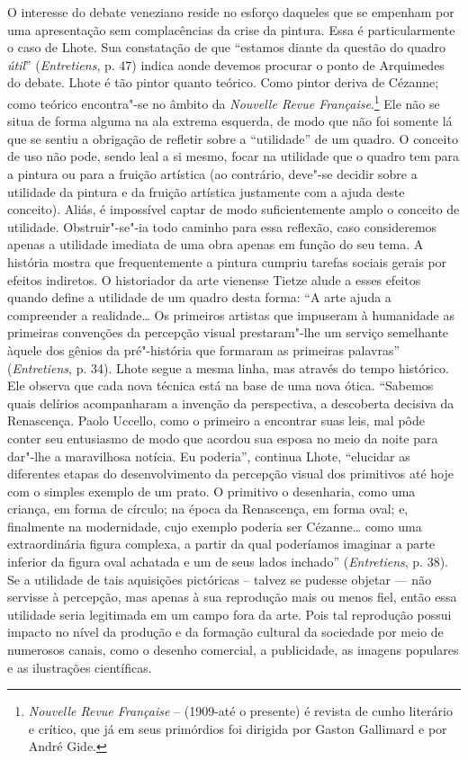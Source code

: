 O interesse do debate veneziano reside no esforço daqueles que se empenham por
uma apresentação sem complacências da crise da pintura. Essa é particularmente o caso
de Lhote. Sua constatação de que ``estamos diante da questão do quadro
\emph{útil}'' (\emph{Entretiens}, p. 47) indica aonde devemos
procurar o ponto de Arquimedes do debate. Lhote é tão pintor quanto
teórico. Como pintor deriva de Cézanne; como teórico encontra"-se no âmbito
da \emph{Nouvelle Revue Française}.\footnote{\emph{Nouvelle Revue
  Française} --  (1909-até o presente) é revista de cunho literário e
  crítico, que já em seus primórdios foi dirigida por Gaston Gallimard e
  por André Gide. \versal{[N. E.]}} Ele não se situa de forma alguma na ala extrema
esquerda, de modo que não foi somente lá que se sentiu a obrigação de refletir sobre
a ``utilidade'' de um quadro. O conceito de uso não pode, sendo leal a si
mesmo, focar na utilidade que o quadro tem para a pintura ou para a
fruição artística (ao contrário, deve"-se decidir sobre a utilidade da pintura e da fruição artística justamente com a ajuda deste conceito). Aliás, é impossível captar de modo
suficientemente amplo o conceito de utilidade. Obstruir"-se"-ia todo
caminho para essa reflexão, caso consideremos apenas a utilidade imediata de uma
obra apenas em função do seu tema. A história mostra que frequentemente a pintura
cumpriu tarefas sociais gerais por efeitos indiretos.
O historiador da arte vienense Tietze alude a esses efeitos quando define
a utilidade de um quadro desta forma: ``A arte ajuda a compreender a realidade\ldots{}
Os primeiros artistas que impuseram à humanidade as primeiras convenções
da percepção visual prestaram"-lhe um serviço semelhante àquele dos
gênios da pré"-história que formaram as primeiras palavras''
(\emph{Entretiens}, p. 34). Lhote segue a mesma linha, mas através do tempo
histórico. Ele observa que cada nova técnica está na base de uma nova
ótica. ``Sabemos quais delírios acompanharam a invenção da perspectiva,
a descoberta decisiva da Renascença. Paolo Uccello, como o primeiro a
encontrar suas leis, mal pôde conter seu entusiasmo de modo que acordou
sua esposa no meio da noite para dar"-lhe a maravilhosa notícia. Eu
poderia'', continua Lhote, ``elucidar as diferentes etapas do
desenvolvimento da percepção visual dos primitivos até hoje com o
simples exemplo de um prato. O primitivo o desenharia, como uma
criança, em forma de círculo; na época da Renascença, em forma oval; e,
finalmente na modernidade, cujo exemplo poderia ser Cézanne\ldots{} como
uma extraordinária figura complexa, a partir da qual poderíamos
imaginar a parte inferior da figura oval achatada e um de seus lados
inchado'' (\emph{Entretiens}, p. 38). Se a utilidade de tais aquisições
pictóricas -- talvez se pudesse objetar --- não servisse à percepção, mas
apenas à sua reprodução mais ou menos fiel, então essa utilidade seria
legitimada em um campo fora da arte. Pois tal reprodução
possui impacto no nível da produção e da formação cultural da sociedade
por meio de numerosos canais, como o desenho comercial, a
publicidade, as imagens populares e as ilustrações científicas.

